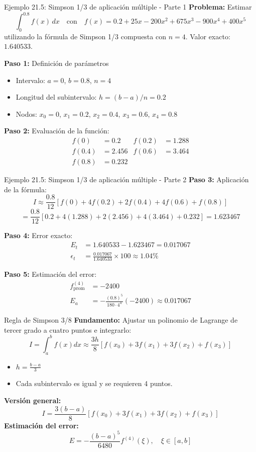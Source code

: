 \documentclass[main.tex]{subfiles}
\begin{document}
\begin{frame}{Ejemplo 21.5: Simpson 1/3 de aplicación múltiple - Parte 1}
\textbf{Problema:} Estimar
\[ \int_0^{0.8} f(x)\,dx \quad \text{con} \quad f(x) = 0.2 + 25x - 200x^2 + 675x^3 - 900x^4 + 400x^5 \]
utilizando la fórmula de Simpson 1/3 compuesta con \(n = 4\). Valor exacto: \(1.640533\).

\textbf{Paso 1:} Definición de parámetros
\begin{itemize}
  \item Intervalo: \(a = 0\), \(b = 0.8\), \(n = 4\)
  \item Longitud del subintervalo: \(h = (b - a)/n = 0.2\)
  \item Nodos: \(x_0 = 0\), \(x_1 = 0.2\), \(x_2 = 0.4\), \(x_3 = 0.6\), \(x_4 = 0.8\)
\end{itemize}

\textbf{Paso 2:} Evaluación de la función:
\begin{align*}
  f(0) &= 0.2 & f(0.2) &= 1.288 \\
  f(0.4) &= 2.456 & f(0.6) &= 3.464 \\
  f(0.8) &= 0.232
\end{align*}
\end{frame}

\begin{frame}{Ejemplo 21.5: Simpson 1/3 de aplicación múltiple - Parte 2}
\textbf{Paso 3:} Aplicación de la fórmula:
\[
I \approx \frac{0.8}{12} [f(0) + 4f(0.2) + 2f(0.4) + 4f(0.6) + f(0.8)]
\]
\[
= \frac{0.8}{12} [0.2 + 4(1.288) + 2(2.456) + 4(3.464) + 0.232] = 1.623467
\]

\textbf{Paso 4:} Error exacto:
\begin{align*}
  E_t &= 1.640533 - 1.623467 = 0.017067 \\
  \epsilon_t &= \frac{0.017067}{1.640533} \times 100 \approx 1.04\%
\end{align*}

\textbf{Paso 5:} Estimación del error:
\begin{align*}
  f^{(4)}_{\text{prom}} &= -2400 \\
  E_a &= -\frac{(0.8)^5}{180 \cdot 4^4} (-2400) \approx 0.017067
\end{align*}
\end{frame}
\begin{frame}{Regla de Simpson 3/8}
\textbf{Fundamento:} Ajustar un polinomio de Lagrange de tercer grado a cuatro puntos e integrarlo:
\[
I = \int_a^b f(x)dx \approx \frac{3h}{8}[f(x_0) + 3f(x_1) + 3f(x_2) + f(x_3)]
\]
\begin{itemize}
  \item \(h = \frac{b - a}{3}\)
  \item Cada subintervalo es igual y se requieren 4 puntos.
\end{itemize}
\textbf{Versión general:}
\[
I = \frac{3(b - a)}{8} [f(x_0) + 3f(x_1) + 3f(x_2) + f(x_3)]
\]
\textbf{Estimación del error:}
\[
E = -\frac{(b - a)^5}{6480} f^{(4)}(\xi), \quad \xi \in [a, b]
\]
\end{frame}
\end{document}
